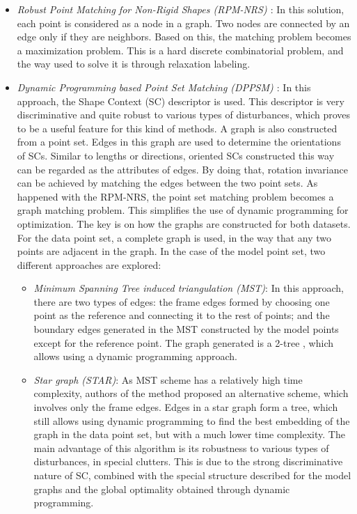 \begin{itemize}
 \item \textit{Robust Point Matching for Non-Rigid Shapes (RPM-NRS) \citep{zheng2006robust}}: In this solution, each 
point is considered as a node in a graph. Two nodes are connected by an edge only if they are neighbors. Based on this, 
the matching problem becomes a maximization problem. This is a hard discrete combinatorial problem, and the way used to 
solve it is through relaxation labeling.
 \item \textit{Dynamic Programming based Point Set Matching (DPPSM) \citep{lian2012rotation}}: In this approach, the 
Shape Context (SC) descriptor is used. This descriptor is very discriminative and quite robust to various types of 
disturbances, which proves to be a useful feature for this kind of methods. A graph is also 
constructed from a point set. Edges in this graph are used to determine the orientations of SCs. Similar to lengths or 
directions, oriented SCs constructed this way can be regarded as the attributes of edges. By doing that, rotation 
invariance can be achieved by matching the edges between the two point sets. As happened with the RPM-NRS, the point set 
matching problem becomes a graph matching problem. This simplifies the use of dynamic programming for optimization.
 The key is on how the graphs are constructed for both datasets. For the data point set, a complete graph is used, in 
the way that any two points are adjacent in the graph. In the case of the model point set, two different approaches are 
explored:
 \begin{itemize}
  \item \textit{Minimum Spanning Tree induced triangulation (MST)}: In this approach, there are two types of edges: the frame edges formed by choosing one point as the reference and connecting it to the rest of points; and the boundary edges generated in the MST constructed by the model points except for the reference point.
  The graph generated is a 2-tree \citep{west2001introduction}, which allows using a dynamic programming approach.
  \item \textit{Star graph (STAR)}: As MST scheme has a relatively high time complexity, authors of the method proposed an alternative scheme, which involves only the frame edges. Edges in a star graph form a tree, which still allows using dynamic programming to find the best embedding of the graph in the data point set, but with a much lower time complexity.
 The main advantage of this algorithm is its robustness to various types of disturbances, in special clutters. This is due to the strong discriminative nature of SC, combined with the special structure described for the model graphs and the global optimality obtained through dynamic programming.
 \end{itemize}
\end{itemize}

